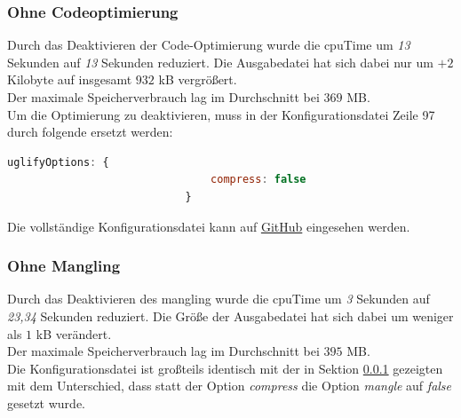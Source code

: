 \documentclass[11pt]{report}
\begin{document}
        		\subsubsection{Ohne Codeoptimierung}
        			\label{section:minification_noCompress}
	        		Durch das Deaktivieren der Code-Optimierung wurde die \Gls{cpuTime} um \emph{13} Sekunden auf \emph{13} Sekunden reduziert. Die Ausgabedatei hat sich dabei nur um $+2$ Kilobyte auf insgesamt $932$ kB vergrößert.\\
	        		Der maximale Speicherverbrauch lag im Durchschnitt bei $369$ MB.\\
		        	Um die Optimierung zu deaktivieren, muss in der Konfigurationsdatei Zeile 97 durch folgende ersetzt werden:\\
		        	\begin{center}
			        	\lstset{%
						    caption=Deaktivierung der Codeoptimierung,
							basicstyle=\footnotesize,
							xleftmargin=.2\textwidth,
							xrightmargin=.2\textwidth,
							numbers=none
						}
			        	\begin{lstlisting}[language=JavaScript]
							uglifyOptions: {
								compress: false
							}
			        	\end{lstlisting}
		        	\end{center}
		        	Die vollständige Konfigurationsdatei kann auf \href{https://github.com/TexNAK/WebBundlerOptimization/compare/master...nondestr_scopedCompilation#diff-1fb5683b1e7adbcee273b7f9f9a08a22}{GitHub} eingesehen werden.
		        	

        		\subsubsection{Ohne Mangling}
	        		Durch das Deaktivieren des \Gls{mangling} wurde die \Gls{cpuTime} um \emph{3} Sekunden auf \emph{23,34} Sekunden reduziert. Die Größe der Ausgabedatei hat sich dabei um weniger als $1$ kB verändert.\\
	        		Der maximale Speicherverbrauch lag im Durchschnitt bei $395$ MB.\\
        			Die Konfigurationsdatei ist großteils identisch mit der in Sektion \ref{section:minification_noCompress} gezeigten mit dem Unterschied, dass statt der Option \emph{compress} die Option \emph{mangle} auf \emph{false} gesetzt wurde.
        			
\end{document}
